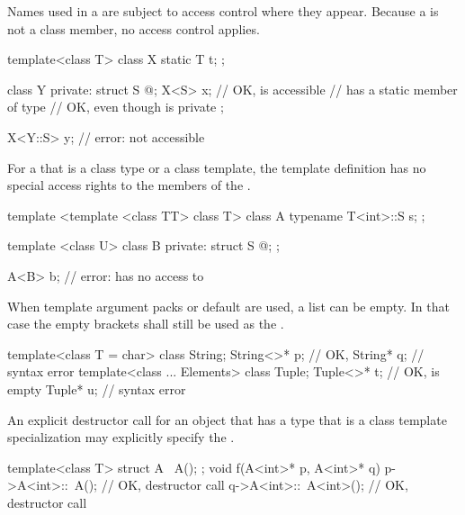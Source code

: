 \pnum
\begin{note}
Names used in a 
are subject to access control where they appear.
Because a  is not a class member,
no access control applies.
\end{note}
\begin{example}
\begin{codeblock}
template<class T> class X {
  static T t;
};

class Y {
private:
  struct S { @\commentellip@ };
  X<S> x;           // OK,  is accessible
                    //  has a static member of type 
                    // OK, even though  is private
};

X<Y::S> y;          // error:  not accessible
\end{codeblock}
\end{example}
For a
that is a class type or a class template, the template
definition has no special access rights to the
members of the .
\begin{example}
\begin{codeblock}
template <template <class TT> class T> class A {
  typename T<int>::S s;
};

template <class U> class B {
private:
  struct S { @\commentellip@ };
};

A<B> b;             // error:  has no access to 
\end{codeblock}
\end{example}

\pnum
When template argument packs or default
are used, a
list can be empty.
In that case the empty
\tcode{<>}
brackets shall still be used as the
.
\begin{example}
\begin{codeblock}
template<class T = char> class String;
String<>* p;                    // OK, 
String* q;                      // syntax error
template<class ... Elements> class Tuple;
Tuple<>* t;                     // OK,  is empty
Tuple* u;                       // syntax error
\end{codeblock}
\end{example}

\pnum
An explicit destructor call for an object that has a type
that is a class template specialization may explicitly specify the
.
\begin{example}
\begin{codeblock}
template<class T> struct A {
  ~A();
};
void f(A<int>* p, A<int>* q) {
  p->A<int>::~A();              // OK, destructor call
  q->A<int>::~A<int>();         // OK, destructor call
}
\end{codeblock}
\end{example}

